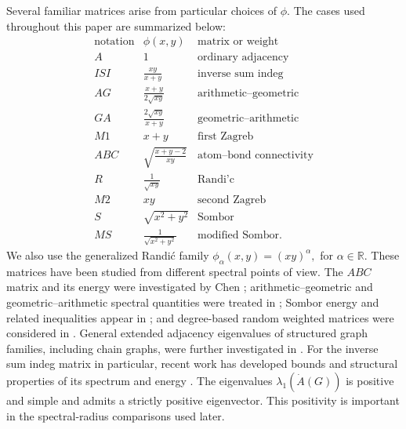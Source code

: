 \documentclass[12pt,twoside]{article}
\begin{document}
Several familiar matrices arise from particular choices of $\phi$. The cases used throughout this paper are summarized below:
$$
\begin{array}{c|c|c}
	\text{notation}&\phi(x,y)&\text{matrix or weight}\\
	\hline
	A&1&\text{ordinary adjacency}\\
	ISI&\frac{xy}{x+y}&\text{inverse sum indeg}\\
	AG&\frac{x+y}{2\sqrt{xy}}&\text{arithmetic--geometric}\\
	GA&\frac{2\sqrt{xy}}{x+y}&\text{geometric--arithmetic}\\
	M1&x+y&\text{first Zagreb}\\
	ABC&\sqrt{\frac{x+y-2}{xy}}&\text{atom--bond connectivity}\\
	R&\frac{1}{\sqrt{xy}}&\text{Randi'c}\\
	M2&xy&\text{second Zagreb}\\
	S&\sqrt{x^2+y^2}&\text{Sombor}\\
	MS&\frac{1}{\sqrt{x^2+y^2}}&\text{modified Sombor}.
\end{array}
$$
We also use the generalized Randić family
$\phi_{\alpha}(x,y)=(xy)^{\alpha},$ for $ \alpha\in\mathbb R.$
These matrices have been studied from different spectral points of view. The $ABC$ matrix and its energy were investigated by Chen \cite{chen2018}; arithmetic--geometric and geometric--arithmetic spectral quantities were treated in \cite{guo,zheng,rodriguez2015,lin1}; Sombor energy and related inequalities appear in \cite{gutman2021,gutmancontributions,bilalMatch,bilalMatch1}; and degree-based random weighted matrices were considered in \cite{li2,li3}. General extended adjacency eigenvalues of structured graph families, including chain graphs, were further investigated in \cite{bilalmdpi}. For the inverse sum indeg matrix in particular, recent work has developed bounds and structural properties of its spectrum and energy \cite{Jamal2023}.
The eigenvalues $\lambda_1(\dot A(G)) $
is positive and simple and admits a strictly positive eigenvector. This positivity is important in the spectral-radius comparisons used later.
\end{document}
